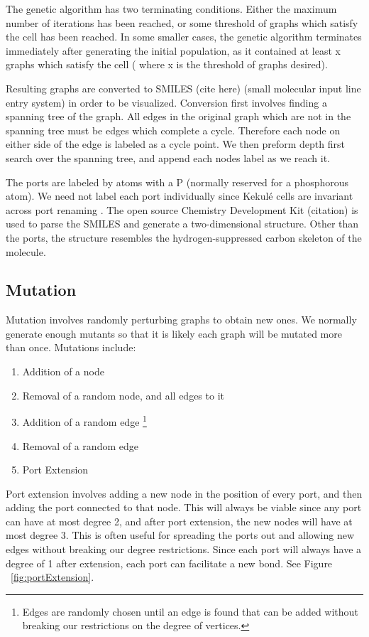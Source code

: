 \documentclass[12pt]{article}
\begin{document}
The genetic algorithm has two terminating conditions. Either the maximum number of iterations has been reached, or some threshold of graphs which satisfy the cell has been reached. In some smaller cases, the genetic algorithm terminates immediately after generating the initial population, as it contained at least x graphs which satisfy the cell ( where x is the threshold of graphs desired).

Resulting graphs are converted to SMILES (cite here) (small molecular input line entry system) in order to be visualized. Conversion first involves finding a spanning tree of the graph. All edges in the original graph which are not in the spanning tree must be edges which complete a cycle. Therefore each node on either side of the edge is labeled as a cycle point. We then preform depth first search over the spanning tree, and append each nodes label as we reach it.

The ports are labeled by atoms with a P (normally reserved for a phosphorous atom). We need not label each port individually since Kekul\'e cells are invariant across port renaming \cite{H13}. The open source Chemistry Development Kit (citation) is used to parse the SMILES and generate a two-dimensional structure. Other than the ports, the structure resembles the hydrogen-suppressed carbon skeleton of the molecule.  

\subsection{Mutation}

Mutation involves randomly perturbing graphs to obtain new ones. We normally  generate enough mutants so that it is likely each graph will be mutated more than once. Mutations include:
\begin{enumerate}
\item Addition of a node
\item Removal of a random node, and all edges to it
\item Addition of a random edge \footnote{ Edges are randomly chosen until an edge is found that can be added without breaking our restrictions on the degree of vertices.}
\item Removal of a random edge
\item Port Extension
\end{enumerate}

Port extension involves adding a new node in the position of every port, and then adding the port connected to that node. This will always be viable since any port can have at most degree 2, and after port extension, the new nodes will have at most degree 3. This is often useful for spreading the ports out and allowing new edges without breaking our degree restrictions. Since each port will always have a degree of 1 after extension, each port can facilitate a new bond. See Figure ~\ref{fig:portExtension}.
\end{document}
